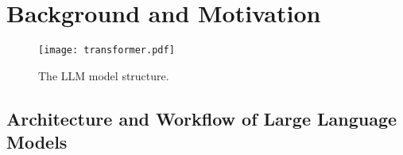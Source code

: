 \section{Background and Motivation}
\label{background}

\begin{figure}
	\centering
	\texttt{[image: transformer.pdf]}
	\vspace{-0.05in}
	\caption{The LLM model structure.}
	\label{fig:llm}
	\vspace{-0.1in}
\end{figure}

\subsection{Architecture and Workflow of Large Language Models}
\label{sec:llm-basic}



